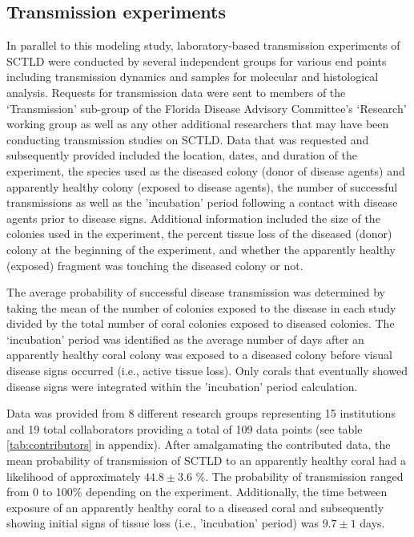 \documentclass[utf8]{frontiersSCNS}
\begin{document}
\subsection{Transmission experiments}\label{sec:transmission}
In parallel to this modeling study, laboratory-based transmission experiments of SCTLD were conducted by several independent groups for various end points including transmission dynamics and samples for molecular and histological analysis. Requests for transmission data were sent to members of the ‘Transmission’ sub-group of the Florida Disease Advisory Committee’s ‘Research’ working group as well as any other additional researchers that may have been conducting transmission studies on SCTLD. Data that was requested and subsequently provided included the location, dates, and duration of the experiment, the species used as the diseased colony (donor of disease agents) and apparently healthy colony (exposed to disease agents), the number of successful transmissions as well as the 'incubation' period following a contact with disease agents prior to disease signs. Additional information included the size of the colonies used in the experiment, the percent tissue loss of the diseased (donor) colony at the beginning of the experiment, and whether the apparently healthy (exposed) fragment was touching the diseased colony or not. 

The average probability of successful disease transmission was determined by taking the mean of the number of colonies exposed to the disease in each study divided by the total number of coral colonies exposed to diseased colonies. The ‘incubation’ period was identified as the average number of days after an apparently healthy coral colony was exposed to a diseased colony before visual disease signs occurred (i.e., active tissue loss). Only corals that eventually showed disease signs were integrated within the 'incubation' period calculation. 

Data was provided from 8 different research groups representing 15 institutions and 19 total collaborators providing a total of 109 data points (see table \ref{tab:contributors} in appendix). After amalgamating the contributed data, the mean probability of transmission of SCTLD to an apparently healthy coral had a likelihood of approximately $44.8 \pm 3.6$ \%. The probability of transmission ranged from 0 to 100\% depending on the experiment. Additionally, the time between exposure of an apparently healthy coral to a diseased coral and subsequently showing initial signs of tissue loss (i.e., 'incubation' period) was $9.7 \pm 1$ days.  
\end{document}
